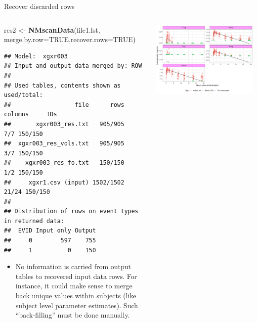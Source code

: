 \documentclass[
  8pt,
  ignorenonframetext,
  aspectratio=169]{beamer}
\newenvironment{Shaded}{\begin{snugshade}}{\end{snugshade}}
\newcommand{\DataTypeTok}[1]{\textcolor[rgb]{0.13,0.29,0.53}{#1}}
\newcommand{\KeywordTok}[1]{\textcolor[rgb]{0.13,0.29,0.53}{\textbf{#1}}}
\newcommand{\NormalTok}[1]{#1}
\newcommand{\OtherTok}[1]{\textcolor[rgb]{0.56,0.35,0.01}{#1}}
\newcommand{\StringTok}[1]{\textcolor[rgb]{0.31,0.60,0.02}{#1}}
\providecommand{\tightlist}{%
  \setlength{\itemsep}{0pt}\setlength{\parskip}{0pt}}
\begin{document}
\begin{frame}[fragile]{Recover discarded rows}
\protect\hypertarget{recover-discarded-rows}{}
\begin{columns}[T]
\begin{column}{0.45\textwidth}
\footnotesize

\begin{Shaded}
\begin{Highlighting}[]
\NormalTok{res2 \textless{}{-}}\StringTok{ }\KeywordTok{NMscanData}\NormalTok{(file1.lst,}
                   \DataTypeTok{merge.by.row=}\OtherTok{TRUE}\NormalTok{,}\DataTypeTok{recover.rows=}\OtherTok{TRUE}\NormalTok{)}
\end{Highlighting}
\end{Shaded}

\begin{verbatim}
## Model:  xgxr003 
## Input and output data merged by: ROW 
## 
## Used tables, contents shown as used/total:
##                  file      rows columns     IDs
##       xgxr003_res.txt   905/905     7/7 150/150
##  xgxr003_res_vols.txt   905/905     3/7 150/150
##    xgxr003_res_fo.txt   150/150     1/2 150/150
##     xgxr1.csv (input) 1502/1502   21/24 150/150
## 
## Distribution of rows on event types in returned data:
##  EVID Input only Output
##     0        597    755
##     1          0    150
\end{verbatim}

\begin{itemize}
\tightlist
\item
  No information is carried from output tables to recovered input data
  rows. For instance, it could make sense to merge back unique values
  within subjects (like subject level parameter estimates). Such
  ``back-filling'' must be done manually.
\end{itemize}
\end{column}

\begin{column}{0.55\textwidth}
\begin{center}\includegraphics[width=1.05\linewidth]{plots/unnamed-chunk-30-1} \end{center}
\end{column}
\end{columns}
\end{frame}
\end{document}
